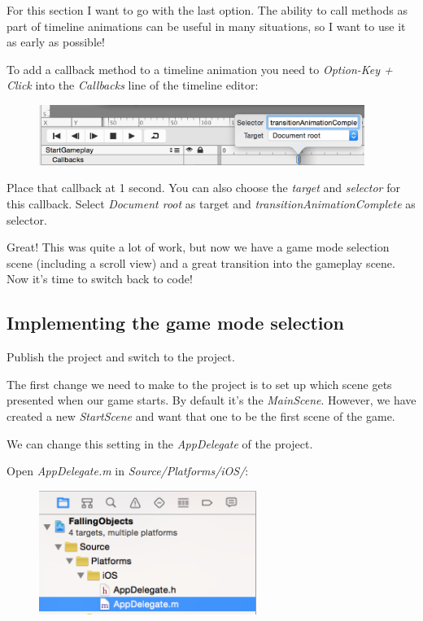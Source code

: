 For this section I want to go with the last option. The ability to call methods
as part of timeline animations can be useful in many situations, so I want to
use it as early as possible!

\begin{leftbar}
To add a callback method to a timeline animation you need to \textit{Option-Key
+ Click} into the \textit{Callbacks} line of the timeline editor:

\begin{figure}[H]
		\centering
		\includegraphics[width=300pt]{images/Chapter7/timeline_callback.png}
\end{figure}
Place that callback at 1 second. You can also choose the \textit{target} and
\textit{selector} for this callback. Select \textit{Document root} as target and
\textit{transitionAnimationComplete} as selector.
\end{leftbar}

Great! This was quite a lot of work, but now we have a game mode selection
scene (including a scroll view) and a great transition into the gameplay scene.
Now it's time to switch back to code!

\subsection{Implementing the game mode selection}

\begin{leftbar}
Publish the \SB{} project and switch to the \xcode{} project.
\end{leftbar}

The first change we need to make to the \xcode{} project is to set up which
scene gets presented when our game starts. By default it's
the \textit{MainScene}. However, we have created a new \textit{StartScene} and want
that one to be the first scene of the game.

We can change this setting in the \textit{AppDelegate} of the project. 
\begin{leftbar}
Open \textit{AppDelegate.m} in \textit{Source/Platforms/iOS/}:
\begin{figure}[H]
		\centering
		\includegraphics[width=200pt]{images/Chapter7/app_delegate.png}
\end{figure}
\end{leftbar}

